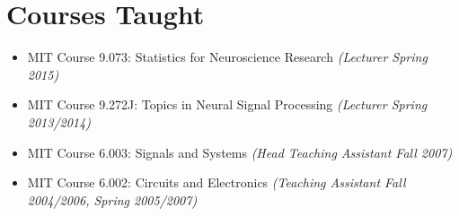 \section*{Courses Taught}

  \begin{itemize}
      \item MIT Course 9.073: Statistics for Neuroscience Research \emph{(Lecturer Spring 2015)}
      \item MIT Course 9.272J: Topics in Neural Signal Processing \emph{(Lecturer Spring 2013/2014)}
      \item MIT Course 6.003: Signals and Systems \emph{(Head Teaching Assistant Fall 2007)}
      \item MIT Course 6.002: Circuits and Electronics \emph{(Teaching Assistant Fall 2004/2006, Spring 2005/2007)}
  \end{itemize}
